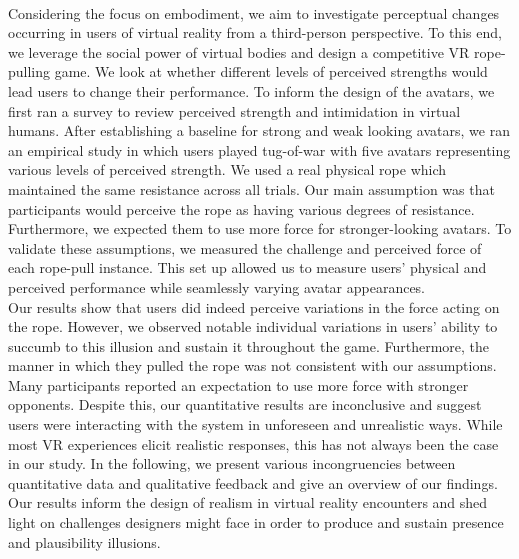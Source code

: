 \\
Considering the focus on embodiment, we aim to investigate perceptual changes occurring in users of virtual reality from a third-person perspective. To this end, we leverage the social power of virtual bodies and design a competitive VR rope-pulling game. We look at whether different levels of perceived strengths would lead users to change their performance. To inform the design of the avatars, we first ran a survey to review perceived strength and intimidation in virtual humans. After establishing a baseline for strong and weak looking avatars, we ran an empirical study in which users played tug-of-war with five avatars representing various levels of perceived strength. We used a real physical rope which maintained the same resistance across all trials. Our main assumption was that participants would perceive the rope as having various degrees of resistance. Furthermore, we expected them to use more force for stronger-looking avatars. To validate these assumptions, we measured the challenge and perceived force of each rope-pull instance. This set up allowed us to measure users' physical and perceived performance while seamlessly varying avatar appearances.
\\
Our results show that users did indeed perceive variations in the force acting on the rope. However, we observed notable individual variations in users' ability to succumb to this illusion and sustain it throughout the game. Furthermore, the manner in which they pulled the rope was not consistent with our assumptions. Many participants reported an expectation to use more force with stronger opponents. Despite this, our quantitative results are inconclusive and suggest users were interacting with the system in unforeseen and unrealistic ways. While most VR experiences elicit realistic responses, this has not always been the case in our study.  In the following, we present various incongruencies between quantitative data and qualitative feedback and give an overview of our findings.  Our results inform the design of realism in virtual reality encounters and shed light on challenges designers might face in order to produce and sustain presence and plausibility illusions.